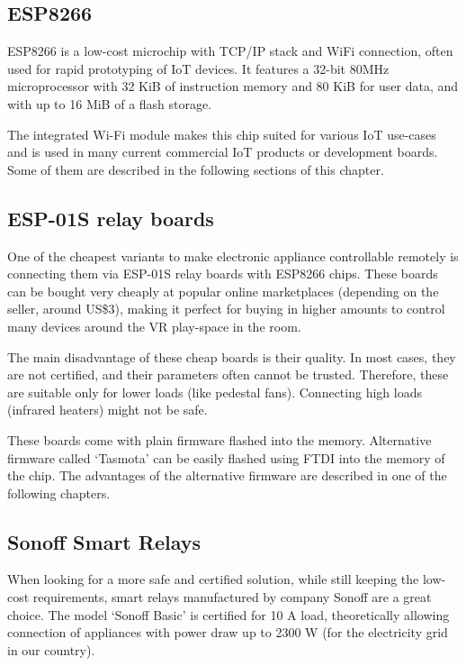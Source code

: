\subsection{ESP8266}

ESP8266 is a low-cost microchip with TCP/IP stack and WiFi connection, 
often used for rapid prototyping of IoT devices. It features
a 32-bit 80MHz microprocessor with 32 KiB of instruction memory and 80 KiB for
user data, and with up to 16 MiB of a flash storage. \cite{espspecs}

The integrated Wi-Fi module makes this chip suited for various IoT use-cases 
and is used in many current commercial IoT products or development boards.
Some of them are described in the following sections of this chapter.

\hypertarget{x-esp-01s-relay-boards}{\subsection{ESP-01S relay boards}}
One of the cheapest variants to make electronic appliance controllable
remotely is connecting them via ESP-01S relay boards with ESP8266 chips.
These boards can be bought very cheaply at popular online marketplaces
(depending on the seller, around US\$3), making it perfect for buying in
higher amounts to control many devices around the VR play-space in the room.

The main disadvantage of these cheap boards is their quality. In most cases,
they are not certified, and their parameters often cannot be trusted. Therefore,
these are suitable only for lower loads (like pedestal fans). Connecting high
loads (infrared heaters) might not be safe.


These boards come with plain firmware flashed into the memory. Alternative
firmware called `Tasmota' can be easily flashed using FTDI into the memory
of the chip. The advantages of the alternative firmware are described
in one of the following chapters.


\hypertarget{x-sonoff-smart-relays}{\subsection{Sonoff Smart Relays}}
When looking for a more safe and certified solution, while still keeping the
low-cost requirements, smart relays manufactured by company Sonoff
are a great choice. The model `Sonoff Basic' is certified for 10 A load,
theoretically allowing connection of appliances with power draw up to 2300 W (for the
electricity grid in our country).


